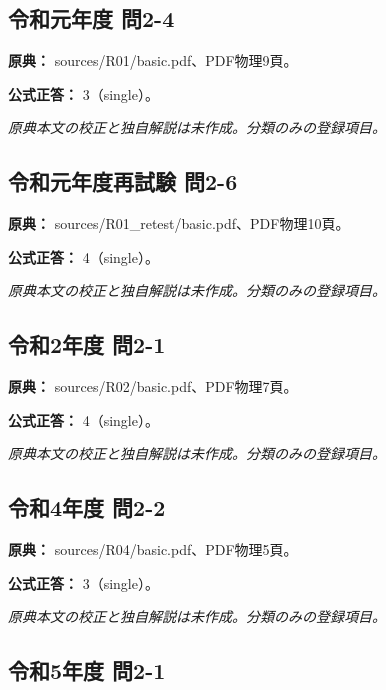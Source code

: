 \subsection{令和元年度 問2-4}
\label{q:r01-reg-basic-2-4}

\noindent\textbf{原典：} sources/R01/basic.pdf、PDF物理9頁。

\textbf{公式正答：} 3（single）。

\par\textit{原典本文の校正と独自解説は未作成。分類のみの登録項目。}

\subsection{令和元年度再試験 問2-6}
\label{q:r01-ret-basic-2-6}

\noindent\textbf{原典：} sources/R01\_retest/basic.pdf、PDF物理10頁。

\textbf{公式正答：} 4（single）。

\par\textit{原典本文の校正と独自解説は未作成。分類のみの登録項目。}

\subsection{令和2年度 問2-1}
\label{q:r02-reg-basic-2-1}

\noindent\textbf{原典：} sources/R02/basic.pdf、PDF物理7頁。

\textbf{公式正答：} 4（single）。

\par\textit{原典本文の校正と独自解説は未作成。分類のみの登録項目。}

\subsection{令和4年度 問2-2}
\label{q:r04-reg-basic-2-2}

\noindent\textbf{原典：} sources/R04/basic.pdf、PDF物理5頁。

\textbf{公式正答：} 3（single）。

\par\textit{原典本文の校正と独自解説は未作成。分類のみの登録項目。}

\subsection{令和5年度 問2-1}
\label{q:r05-reg-basic-2-1}

